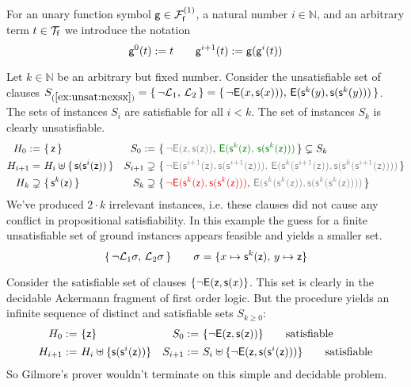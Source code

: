\begin{definition}
	For an unary function symbol $\mg\in\mcFfn[1]$, a natural number
	$i\in\mathbb{N}$, and an arbitrary term $t\in\mcTf$ we introduce the notation
	\[
	\mg^0(t) := t \qquad
	\mg^{i+1}(t) := \mg(\mg^i(t))
	\]
\end{definition}

\begin{example}\label{ex:unsat:nexsx}
	Let $k\in\mathbb{N}$ be an arbitrary but fixed number.
	Consider the unsatisfiable set of clauses
	$S_{(\ref{ex:unsat:nexsx})} = \{\, \lnot\mcL_1,\,\mcL_2\, \} =
	\{\,
	{ \lnot\mE(x, \msucc(x)))},\, 
	{ \mE(\msucc^{k}(y), \msucc(\msucc^{k}(y)))}
	\,\}$.
	The sets of instances $S_{i}$ are satisfiable for all $i<k$.
	The set of instances $S_{k}$ is clearly unsatisfiable.
	\begin{align*}
	H_{0} :=&\ \{\,\mzero\,\} 
	&
	S_{0} :=&\ \{\, 
	{\colG \lnot\mE(\mzero,\msucc(\mzero))},\,
	{\colHi \mE(\msucc^k(\mzero),\,\msucc(\msucc^k(\mzero)))}
	\,\}
	\subsetneq S_k
	\\
	H_{i+1} =&\ H_i\disjointunion\{\,\msucc(\msucc^{i}(\mzero))\,\}
	&
	S_{i+1} \supsetneq&\
	\{\,
	{\colG \lnot\mE(\msucc^{i+1}(\mzero),\msucc(\msucc^{i+1}(\mzero))),\,
	\mE(\msucc^k(\msucc^{i+1}(\mzero)), \msucc(\msucc^k(\msucc^{i+1}(\mzero))))}
	\,\}
	\\
	H_{k} \supsetneq&\ \{\,\msucc^{k}(\mzero)\,\} 
	&
	S_{k} \supsetneq&\
	\{\,
	{\colLo \lnot\mE(\msucc^{k}(\mzero),\msucc(\msucc^{k}(\mzero)))},\,
	{\colG\mE(\msucc^k(\msucc^{k}(\mzero)), \msucc(\msucc^k(\msucc^{k}(\mzero))))}
	\,\}
	\end{align*}
	We've produced $2\cdot k$ {\myem irrelevant} instances, i.e. these clauses did not cause any conflict in 
	propositional satisfiability. 
	In this example the guess for a finite unsatisfiable set of ground instances appears feasible and yields a smaller set.
	\[
	\{\, 
	\lnot\mcL_1\sigma,\,\mcL_2\sigma
	\,\} \qquad \sigma=\{x\mapsto \msucc^k(\mzero),\,y\mapsto \mzero\}
	\]
\end{example}

\begin{example}\label{ex:sat:exy}
	Consider the satisfiable set of clauses $\{\lnot\mE(\mzero,\msucc(x)\}$.
	This set is clearly in the decidable Ackermann fragment of first order logic.
	But the procedure yields an infinite sequence of distinct and satisfiable sets $S_{k\geq0}$:
	\begin{align*}
	H_{0} :=&\  \{ \mzero \} 
	&
	S_{0} :=&\ \{ \lnot\mE(\mzero,\msucc(\mzero))
	\}
	\tag*{satisfiable}
	\\
	H_{i+1} :=&\ H_i \disjointunion \{ \msucc(\msucc^{i}(\mzero)) \} 
	&
	S_{i+1} :=&\ S_i \disjointunion 
	\{
	\lnot\mE(\mzero,\msucc(\msucc^i(\mzero)))
	\}
	\tag*{satisfiable}
	\end{align*}
	So Gilmore's prover wouldn't terminate on this simple and decidable problem.
\end{example}



